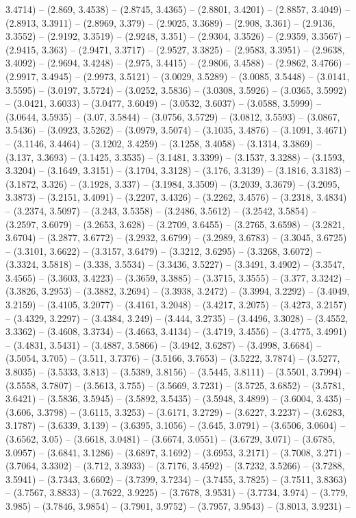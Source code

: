 3.4714) -- (2.869, 3.4538) -- (2.8745, 3.4365) -- (2.8801, 3.4201) -- (2.8857, 3.4049) -- (2.8913, 3.3911) -- (2.8969, 3.379) -- (2.9025, 3.3689) -- (2.908, 3.361) -- (2.9136, 3.3552) -- (2.9192, 3.3519) -- (2.9248, 3.351) -- (2.9304, 3.3526) -- (2.9359, 3.3567) -- (2.9415, 3.363) -- (2.9471, 3.3717) -- (2.9527, 3.3825) -- (2.9583, 3.3951) -- (2.9638, 3.4092) -- (2.9694, 3.4248) -- (2.975, 3.4415) -- (2.9806, 3.4588) -- (2.9862, 3.4766) -- (2.9917, 3.4945) -- (2.9973, 3.5121) -- (3.0029, 3.5289) -- (3.0085, 3.5448) -- (3.0141, 3.5595) -- (3.0197, 3.5724) -- (3.0252, 3.5836) -- (3.0308, 3.5926) -- (3.0365, 3.5992) -- (3.0421, 3.6033) -- (3.0477, 3.6049) -- (3.0532, 3.6037) -- (3.0588, 3.5999) -- (3.0644, 3.5935) -- (3.07, 3.5844) -- (3.0756, 3.5729) -- (3.0812, 3.5593) -- (3.0867, 3.5436) -- (3.0923, 3.5262) -- (3.0979, 3.5074) -- (3.1035, 3.4876) -- (3.1091, 3.4671) -- (3.1146, 3.4464) -- (3.1202, 3.4259) -- (3.1258, 3.4058) -- (3.1314, 3.3869) -- (3.137, 3.3693) -- (3.1425, 3.3535) -- (3.1481, 3.3399) -- (3.1537, 3.3288) -- (3.1593, 3.3204) -- (3.1649, 3.3151) -- (3.1704, 3.3128) -- (3.176, 3.3139) -- (3.1816, 3.3183) -- (3.1872, 3.326) -- (3.1928, 3.337) -- (3.1984, 3.3509) -- (3.2039, 3.3679) -- (3.2095, 3.3873) -- (3.2151, 3.4091) -- (3.2207, 3.4326) -- (3.2262, 3.4576) -- (3.2318, 3.4834) -- (3.2374, 3.5097) -- (3.243, 3.5358) -- (3.2486, 3.5612) -- (3.2542, 3.5854) -- (3.2597, 3.6079) -- (3.2653, 3.628) -- (3.2709, 3.6455) -- (3.2765, 3.6598) -- (3.2821, 3.6704) -- (3.2877, 3.6772) -- (3.2932, 3.6799) -- (3.2989, 3.6783) -- (3.3045, 3.6725) -- (3.3101, 3.6622) -- (3.3157, 3.6479) -- (3.3212, 3.6295) -- (3.3268, 3.6072) -- (3.3324, 3.5818) -- (3.338, 3.5534) -- (3.3436, 3.5227) -- (3.3491, 3.4902) -- (3.3547, 3.4565) -- (3.3603, 3.4223) -- (3.3659, 3.3885) -- (3.3715, 3.3555) -- (3.377, 3.3242) -- (3.3826, 3.2953) -- (3.3882, 3.2694) -- (3.3938, 3.2472) -- (3.3994, 3.2292) -- (3.4049, 3.2159) -- (3.4105, 3.2077) -- (3.4161, 3.2048) -- (3.4217, 3.2075) -- (3.4273, 3.2157) -- (3.4329, 3.2297) -- (3.4384, 3.249) -- (3.444, 3.2735) -- (3.4496, 3.3028) -- (3.4552, 3.3362) -- (3.4608, 3.3734) -- (3.4663, 3.4134) -- (3.4719, 3.4556) -- (3.4775, 3.4991) -- (3.4831, 3.5431) -- (3.4887, 3.5866) -- (3.4942, 3.6287) -- (3.4998, 3.6684) -- (3.5054, 3.705) -- (3.511, 3.7376) -- (3.5166, 3.7653) -- (3.5222, 3.7874) -- (3.5277, 3.8035) -- (3.5333, 3.813) -- (3.5389, 3.8156) -- (3.5445, 3.8111) -- (3.5501, 3.7994) -- (3.5558, 3.7807) -- (3.5613, 3.755) -- (3.5669, 3.7231) -- (3.5725, 3.6852) -- (3.5781, 3.6421) -- (3.5836, 3.5945) -- (3.5892, 3.5435) -- (3.5948, 3.4899) -- (3.6004, 3.435) -- (3.606, 3.3798) -- (3.6115, 3.3253) -- (3.6171, 3.2729) -- (3.6227, 3.2237) -- (3.6283, 3.1787) -- (3.6339, 3.139) -- (3.6395, 3.1056) -- (3.645, 3.0791) -- (3.6506, 3.0604) -- (3.6562, 3.05) -- (3.6618, 3.0481) -- (3.6674, 3.0551) -- (3.6729, 3.071) -- (3.6785, 3.0957) -- (3.6841, 3.1286) -- (3.6897, 3.1692) -- (3.6953, 3.2171) -- (3.7008, 3.271) -- (3.7064, 3.3302) -- (3.712, 3.3933) -- (3.7176, 3.4592) -- (3.7232, 3.5266) -- (3.7288, 3.5941) -- (3.7343, 3.6602) -- (3.7399, 3.7234) -- (3.7455, 3.7825) -- (3.7511, 3.8363) -- (3.7567, 3.8833) -- (3.7622, 3.9225) -- (3.7678, 3.9531) -- (3.7734, 3.974) -- (3.779, 3.985) -- (3.7846, 3.9854) -- (3.7901, 3.9752) -- (3.7957, 3.9543) -- (3.8013, 3.9231) -- 